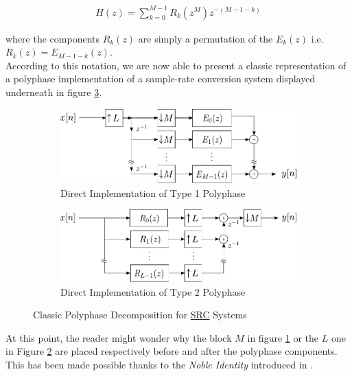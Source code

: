 \begin{align}
	H(z) = \sum\limits_{k=0}^{M-1} R_k(z^M)z^{-(M-1-k)} \label{eqn:poly2}
\end{align}

where the components $R_k(z)$ are simply a permutation of the $E_k(z)$ i.e. $R_k(z) = E_{M-1-k}(z)$.\\ 

According to this notation, we are now able to present a classic representation of a polyphase implementation of a sample-rate conversion system displayed underneath in figure \ref{Figure 3.7}.


\begin{figure}[htb!]
	\centering
	\begin{subfigure}[b]{\textwidth}
		\centering
		\includegraphics[scale=0.95]{polyphase_direct_M.pdf}
		\vspace*{1mm}
		\caption{Direct Implementation of Type 1 Polyphase}\label{3.7.a}
	\end{subfigure}	


	\centering
	\begin{subfigure}[b]{\textwidth}
		\centering
		\includegraphics[scale=0.95]{polyphase_direct_L.pdf}%
		\vspace*{1mm}
		\caption{Direct Implementation of Type 2 Polyphase}\label{3.7.b}
	\end{subfigure}	
	\caption{Classic Polyphase Decomposition for \protect\hyperlink{SRC}{SRC} Systems}
	\label{Figure 3.7}
\end{figure}

At this point, the reader might wonder why the block $M$ in figure \ref{3.7.a} or the $L$ one in Figure \ref{3.7.b} are placed respectively before and after the polyphase components. This has been made possible thanks to the \textit{Noble Identity} introduced in \cite[p.~204-205]{Oppenheim}.

